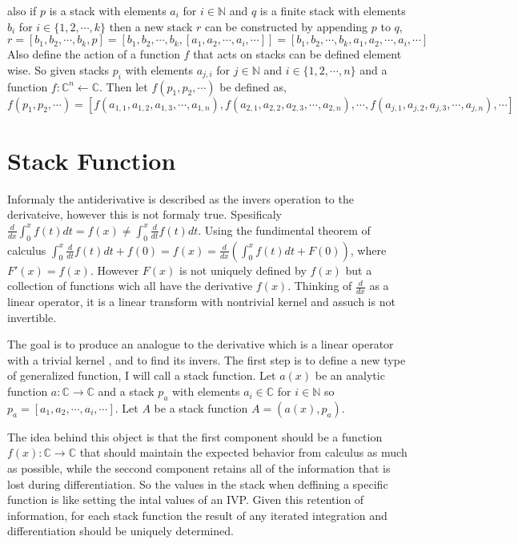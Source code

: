 \documentclass[%
 onecolumn,
 amsmath, amssymb, aps, pra, 10pt
]{revtex4-2}
\begin{document}
also if $p$ is a stack with elements $a_i$ for $i \in \mathbb{N}$ and $q$ is a finite stack with elements $b_i$ for $i \in \{1, 2, \cdots, k\}$ then a new stack $r$ can be constructed by appending $p$ to $q$,
\[r = [b_1, b_2, \cdots, b_k, p] = [b_1, b_2, \cdots, b_k, [a_1, a_2, \cdots, a_i, \cdots]] = [b_1, b_2, \cdots, b_k, a_1, a_2, \cdots, a_i, \cdots]\]
Also define the action of a function $f$ that acts on stacks can be defined element wise. So given stacks $p_i$ with elements $a_{j, i}$ for $j \in \mathbb{N}$ and $i \in \{1, 2, \cdots, n\}$ and a function $f:\mathbb{C}^n \leftarrow \mathbb{C}$. Then let $f(p_1, p_2, \cdots)$ be defined as,
\[f(p_1, p_2, \cdots) = [f(a_{1, 1}, a_{1, 2}, a_{1, 3}, \cdots, a_{1, n}), f(a_{2, 1}, a_{2, 2}, a_{2, 3}, \cdots, a_{2, n}), \cdots, f(a_{j, 1}, a_{j, 2}, a_{j, 3}, \cdots, a_{j, n}), \cdots]\]

\section{Stack Function}
Informaly the antiderivative is described as the invers operation to the derivateive, however this is not formaly true. Spesificaly $\frac{d}{dx} \int_{0}^x f(t)dt = f(x) \neq \int_{0}^x \frac{d}{dt} f(t) dt$. Using the fundimental theorem of calculus $\int_{0}^x \frac{d}{dt} f(t) dt + f(0) = f(x) = \frac{d}{dx} \left( \int_{0}^x f(t) dt + F(0) \right)$, where $F'(x) = f(x)$. However $F(x)$ is not uniquely defined by $f(x)$ but a collection of functions wich all have the derivative $f(x)$. Thinking of $\frac{d}{dx}$ as a linear operator, it is a linear transform with nontrivial kernel and assuch is not invertible.

The goal is to produce an analogue to the derivative which is a linear operator with a trivial kernel , and to find its invers. The first step is to define a new type of generalized function, I will call a stack function. Let $a(x)$ be an analytic function $a:\mathbb{C}\rightarrow\mathbb{C}$ and a stack $p_a$ with elements $a_i \in \mathbb{C}$ for $i \in \mathbb{N}$ so $p_a = [a_1, a_2, \cdots, a_i, \cdots]$. Let $A$ be a stack function $A = (a(x), p_a)$.

The idea behind this object is that the first component should be a function $f(x):\mathbb{C}\rightarrow\mathbb{C}$ that should maintain the expected behavior from calculus as much as possible, while the seccond component retains all of the information that is lost during differentiation. So the values in the stack when deffining a specific function is like setting the intal values of an IVP. Given this retention of information, for each stack function the result of any iterated integration and differentiation should be uniquely determined.
\end{document}
